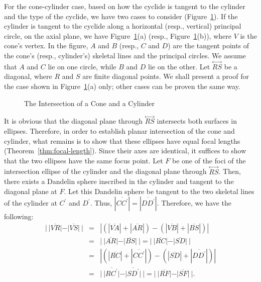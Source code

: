      For the cone-cylinder case, based on how the cyclide is tangent to the
cylinder and the type of the cyclide, we have two cases to consider
(Figure~\ref{fig:cone-cy-cyclide}).  If the cylinder is tangent to the cyclide
along a horizontal (resp., vertical) principal circle, on the axial plane, we 
have Figure~\ref{fig:cone-cy-cyclide}(a) 
(resp., Figure~\ref{fig:cone-cy-cyclide}(b)), where $V$ is the cone's
vertex.  In the figure, $A$ and $B$ (resp., $C$ and $D$) are the tangent 
points of the cone's (resp., cylinder's) skeletal lines and the principal
circles.  We assume that $A$ and $C$ lie on one circle, while $B$ and $D$ lie
on the other.  Let $\stackrel{\longleftrightarrow}{RS}$ be a diagonal, where 
$R$ and $S$ are finite diagonal points.  
We shall present a proof for the case shown in 
Figure~\ref{fig:cone-cy-cyclide}(a) only; other cases can be proven the same
way.
\begin{figure}
\vspace{6cm}
\caption{The Intersection of a Cone and a Cylinder}
\label{fig:cone-cy-cyclide}
\end{figure}

     It is obvious that the diagonal plane through 
$\stackrel{\longleftrightarrow}{RS}$ intersects both surfaces in ellipses.
Therefore, in order to establish planar intersection of the cone and cylinder,
what remains is to show that these ellipses have equal focal lengths
(Theorem~\ref{thm:focal-length}).   Since their axes are identical, it 
suffices to show that the two ellipses have the same focus point.  
Let $F$ be one of the foci of the
intersection ellipse of the cylinder and the diagonal plane through
$\stackrel{\longleftrightarrow}{RS}$.  Then, there exists a Dandelin sphere
inscribed in the cylinder and tangent to the diagonal plane at $F$.
Let this Dandelin sphere be tangent to the two skeletal lines of the cylinder
at $C^\prime$ and $D^\prime$.  
Thus, $|\overline{CC^\prime}|=|\overline{DD^\prime}|$.
Therefore, we have the following:
\begin{eqnarray*}
     |\ |\overline{VR}|-|\overline{VS}|\ | 
          &=& |(|\overline{VA}|+|\overline{AR}|) -
               (|\overline{VB}|+|\overline{BS}|)| \\
          &=& |\ |\overline{AR}|-|\overline{BS}|\ |
           =  |\ |\overline{RC}|-|\overline{SD}|\ | \\
          &=& |(|\overline{RC}|+|\overline{CC^\prime}|)-
               (|\overline{SD}|+|\overline{DD^\prime}|)| \\
          &=& |\ |\overline{RC^\prime}|-|\overline{SD^\prime}|\ |
           =  |\ |\overline{RF}|-|\overline{SF}|\ |.
\end{eqnarray*}

